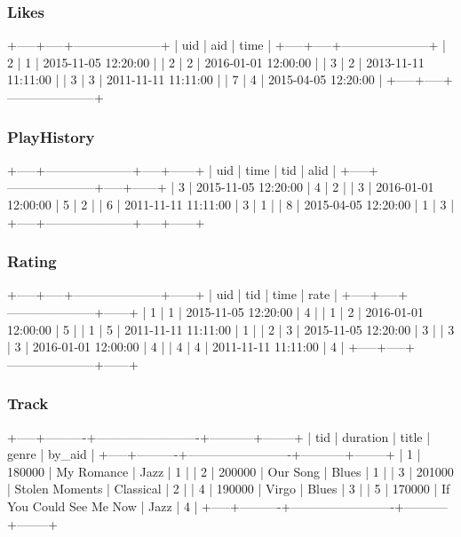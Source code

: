 \documentclass[letterpaper, 12pt]{report}
\begin{document}
	\subsubsection{Likes}
	\begin{spverbatim}
		+-----+-----+---------------------+
		| uid | aid | time                |
		+-----+-----+---------------------+
		|   2 |   1 | 2015-11-05 12:20:00 |
		|   2 |   2 | 2016-01-01 12:00:00 |
		|   3 |   2 | 2013-11-11 11:11:00 |
		|   3 |   3 | 2011-11-11 11:11:00 |
		|   7 |   4 | 2015-04-05 12:20:00 |
		+-----+-----+---------------------+
	\end{spverbatim}

	\subsubsection{PlayHistory}
	\begin{spverbatim}
		+-----+---------------------+-----+------+
		| uid | time                | tid | alid |
		+-----+---------------------+-----+------+
		|   3 | 2015-11-05 12:20:00 |   4 |    2 |
		|   3 | 2016-01-01 12:00:00 |   5 |    2 |
		|   6 | 2011-11-11 11:11:00 |   3 |    1 |
		|   8 | 2015-04-05 12:20:00 |   1 |    3 |
		+-----+---------------------+-----+------+
	\end{spverbatim}

	\subsubsection{Rating}
	\begin{spverbatim}
		+-----+-----+---------------------+------+
		| uid | tid | time                | rate |
		+-----+-----+---------------------+------+
		|   1 |   1 | 2015-11-05 12:20:00 |    4 |
		|   1 |   2 | 2016-01-01 12:00:00 |    5 |
		|   1 |   5 | 2011-11-11 11:11:00 |    1 |
		|   2 |   3 | 2015-11-05 12:20:00 |    3 |
		|   3 |   3 | 2016-01-01 12:00:00 |    4 |
		|   4 |   4 | 2011-11-11 11:11:00 |    4 |
		+-----+-----+---------------------+------+
	\end{spverbatim}

	\subsubsection{Track}
	\begin{spverbatim}
		+-----+----------+-------------------------+-----------+--------+
		| tid | duration | title                   | genre     | by_aid |
		+-----+----------+-------------------------+-----------+--------+
		|   1 |   180000 | My Romance              | Jazz      |      1 |
		|   2 |   200000 | Our Song                | Blues     |      1 |
		|   3 |   201000 | Stolen Moments          | Classical |      2 |
		|   4 |   190000 | Virgo                   | Blues     |      3 |
		|   5 |   170000 | If You Could See Me Now | Jazz      |      4 |
		+-----+----------+-------------------------+-----------+--------+
	\end{spverbatim}
\end{document}
